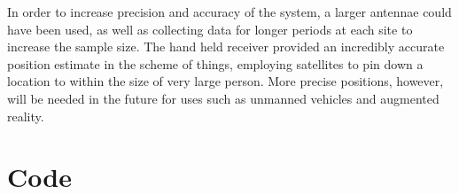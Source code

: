 \documentclass[11pt]{article}
\begin{document}
In order to increase precision and accuracy of the system, a larger antennae could have been used, as well as collecting data for longer periods at each site to increase the sample size. The hand held receiver provided an incredibly accurate position estimate in the scheme of things, employing satellites to pin down a location to within the size of very large person. More precise positions, however, will be needed in the future for uses such as unmanned vehicles and augmented reality.


\pagebreak
\section{Code}
%
%
%
%
%

  
\end{document}
